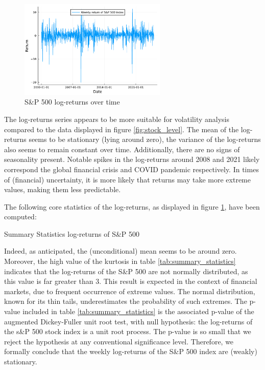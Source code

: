 \begin{figure}[H]
    \centering
    \includegraphics[width=0.625\textwidth]{figures/stock_returns.pdf}
    \caption{S\&P 500 log-returns over time}
    \label{fig:stock_returns}
\end{figure}
The log-returns series appears to be more suitable for volatility analysis compared to the data displayed in figure \ref{fig:stock_level}. The mean of the log-returns seems to be stationary (lying around zero), the variance of the log-returns also seems to remain constant over time. Additionally, there are no signs of seasonality present. Notable spikes in the log-returns around 2008 and 2021 likely correspond the global financial crisis and COVID pandemic respectively. In times of (financial) uncertainty, it is more likely that returns may take more extreme values, making them less predictable.
\newline

The following core statistics of the log-returns, as displayed in figure \ref{fig:stock_returns}, have been computed:

\begin{table}[H]
    \centering

\caption{Summary Statistics log-returns of S\&P 500} 
\label{tab:summary_statistics}
\end{table}
Indeed, as anticipated, the (unconditional) mean seems to be around zero. Moreover, the high value of the kurtosis in table \ref{tab:summary_statistics} indicates that the log-returns of the S\&P 500 are not normally distributed, as this value is far greater than 3. This result is expected in the context of financial markets, due to frequent occurrence of extreme values. The normal distribution, known for its thin tails, underestimates the probability of such extremes. The p-value included in table \ref{tab:summary_statistics} is the associated p-value of the augmented Dickey-Fuller unit root test, with null hypothesis: the log-returns of the s\&P 500 stock index is a unit root process.  The p-value is so small that we reject the hypothesis at any conventional significance level. Therefore, we formally conclude that the weekly log-returns of the S\&P 500 index are (weakly) stationary.

